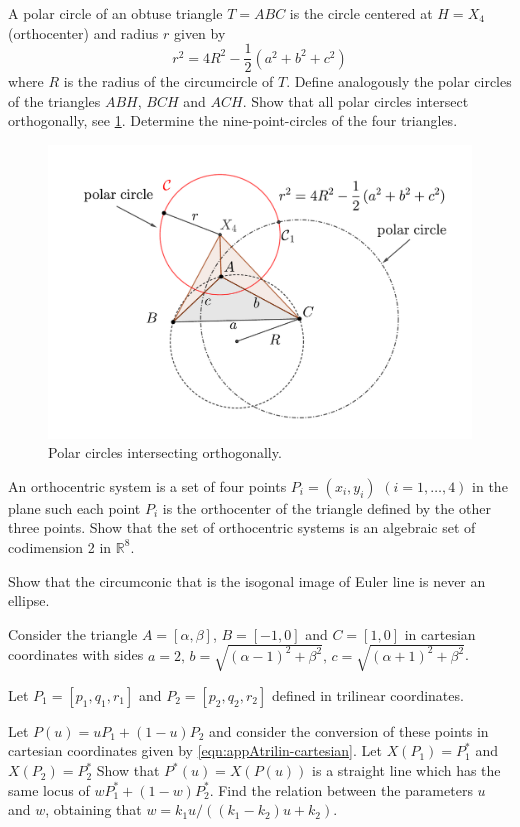 \begin{exercise}
A polar circle of an obtuse triangle $T=ABC$ is the  circle centered at $H=X_4$ (orthocenter) and radius $r$ given by
\[ r^2=4R^2-\frac{1}{2}(a^2+b^2+c^2)\]
where $R$ is the radius of the circumcircle of $T$. Define analogously the polar circles of the triangles $ABH$, $BCH$ and $ACH$. Show that all polar circles intersect orthogonally, see \cref{fig:pics-appA-polarcircles}.
Determine the nine-point-circles of the four triangles.

\begin{figure}
    \centering
    \includegraphics[scale=0.4]{zappA/pics/pics-appA-108-polar-circle-ortocentro.pdf}
    \caption{Polar circles intersecting orthogonally.}
    \label{fig:pics-appA-polarcircles}
\end{figure}

An orthocentric system is a set of four points $P_i=(x_i,y_i)$ $ (i=1,\ldots,4)$ in the plane such each point $P_i$ is the orthocenter of the triangle defined by the other three points. Show that the set of orthocentric systems is an algebraic set  of codimension 2 in $\mathbb{R}^8$.
\end{exercise}

\begin{exercise}
Show that the circumconic that is the isogonal image of Euler line is never an ellipse. 
\label{ex:appA-isogonal-euler}
\end{exercise}

\begin{exercise}
Consider the triangle $A=[\alpha,\beta]$, $B=[-1,0]$
and $C=[1,0]$ in cartesian coordinates with sides
$a=2,\, b=\sqrt{(\alpha-1)^2+\beta^2}, \, c=\sqrt{(\alpha+1)^2+\beta^2}$.

Let   $P_1=[p_1,q_1,r_1]$ and $P_2=[p_2,q_2,r_2]$ defined in trilinear coordinates.
 
Let $P(u)=u P_1+(1-u) P_2 $ and consider the conversion of these points in cartesian coordinates given by \cref{eqn:appAtrilin-cartesian}.
Let $X(P_1)=P_1^*$ and $X(P_2)=P_2^*$
Show that $P^{*}(u)=X(P(u))$ is a straight line which has the same locus of $w P_1^{*}+(1-w)P_2^{*}$. Find the relation between the parameters $u$ and $w$, obtaining that $w=k_1 u/((k_1 -k_2)u+k_2)$.
\end{exercise}


